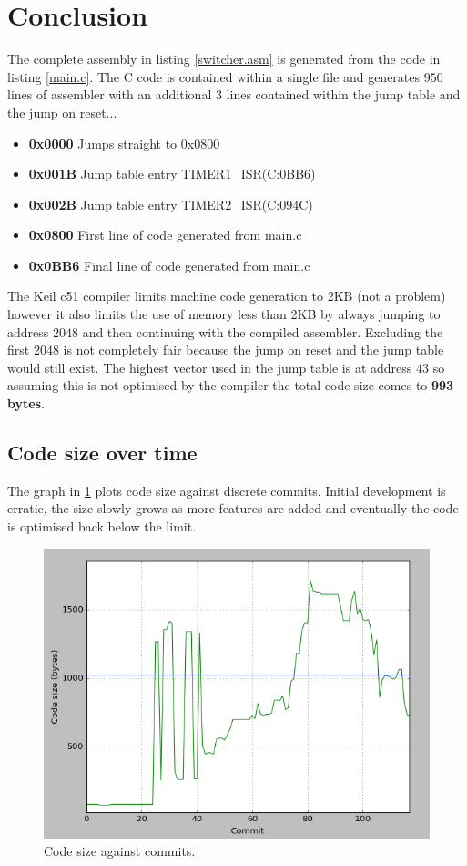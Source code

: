 \documentclass[12pt]{article}%
\begin{document}
\section{Conclusion}

The complete assembly in listing \ref{switcher.asm} is generated from the code in listing \ref{main.c}. The C code is contained within a single file and generates $950$ lines of assembler with an additional $3$ lines contained within the jump table and the jump on reset...

\begin{itemize}
  	\item \textbf{0x0000} Jumps straight to 0x0800
	\item \textbf{0x001B} Jump table entry TIMER1\_ISR(C:0BB6)
	\item \textbf{0x002B} Jump table entry TIMER2\_ISR(C:094C)
	\item \textbf{0x0800} First line of code generated from main.c
  	\item \textbf{0x0BB6} Final line of code generated from main.c
\end{itemize}

The Keil c51 compiler limits machine code generation to 2KB (not a problem) however it also limits the use of memory less than 2KB by always jumping to address $2048$ and then continuing with the compiled assembler. Excluding the first $2048$ is not completely fair because the jump on reset and the jump table would still exist. The highest vector used in the jump table is at address $43$ so assuming this is not optimised by the compiler the total code size comes to \textbf{993 bytes}.

\subsection{Code size over time}

The graph in \ref{fig:size} plots code size against discrete commits. Initial development is erratic, the size slowly grows as more features are added and eventually the code is optimised  back below the limit.

\begin{figure}[H]
	\centering
  	\includegraphics[width=12cm]{size.png}
  	\caption{Code size against commits.}
  	\label{fig:size}
\end{figure}
\end{document}
